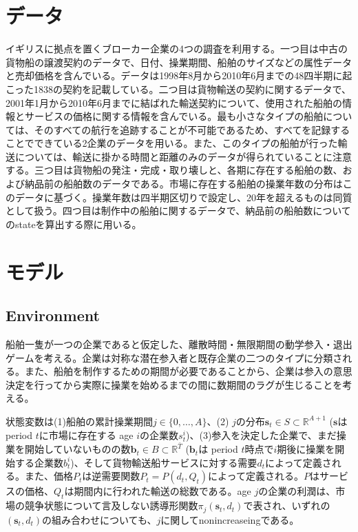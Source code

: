 \documentclass[11pt]{jsarticle}
\begin{document}
\section{データ}

イギリスに拠点を置くブローカー企業の4つの調査を利用する。一つ目は中古の貨物船の譲渡契約のデータで、日付、操業期間、船舶のサイズなどの属性データと売却価格を含んでいる。データは1998年8月から2010年6月までの48四半期に起こった1838の契約を記載している。二つ目は貨物輸送の契約に関するデータで、2001年1月から2010年6月までに結ばれた輸送契約について、使用された船舶の情報とサービスの価格に関する情報を含んでいる。最も小さなタイプの船舶については、そのすべての航行を追跡することが不可能であるため、すべてを記録することでできている2企業のデータを用いる。また、このタイプの船舶が行った輸送については、輸送に掛かる時間と距離のみのデータが得られていることに注意する。三つ目は貨物船の発注・完成・取り壊しと、各期に存在する船舶の数、および納品前の船舶数のデータである。市場に存在する船舶の操業年数の分布はこのデータに基づく。操業年数は四半期区切りで設定し、20年を超えるものは同質として扱う。四つ目は制作中の船舶に関するデータで、納品前の船舶数についてのstateを算出する際に用いる。

\section{モデル}

\subsection{Environment}

船舶一隻が一つの企業であると仮定した、離散時間・無限期間の動学参入・退出ゲームを考える。企業は対称な潜在参入者と既存企業の二つのタイプに分類される。また、船舶を制作するための期間が必要であることから、企業は参入の意思決定を行ってから実際に操業を始めるまでの間に数期間のラグが生じることを考える。

状態変数は(1)船舶の累計操業期間$j \in \{ 0, \ldots, A\} $、(2) $j$の分布$\mathbf{s}_t \in S \subset \mathbb{R}^{A+1}$ ($\mathbf{s}$はperiod $t$に市場に存在する age $i$の企業数$s_t^i$)、(3)参入を決定した企業で、まだ操業を開始していないものの数$\mathbf{b}_t \in B \subset \mathbb{R}^{\bar{T}}$ ($ \mathbf{b}_t$は period $t$時点で$i$期後に操業を開始する企業数$b_t^i$)、そして貨物輸送船サービスに対する需要$d_t$によって定義される。また、価格$P_t$は逆需要関数$P_t = P(d_t, Q_t)$によって定義される。$P$はサービスの価格、$Q_t$は期間内に行われた輸送の総数である。age $j$の企業の利潤は、市場の競争状態について言及しない誘導形関数$\pi_j(\mathbf{s}_t, d_t)$で表され、いずれの$(\mathbf{s}_t, d_t)$の組み合わせについても、$j$に関してnonincreaseingである。
\end{document}
